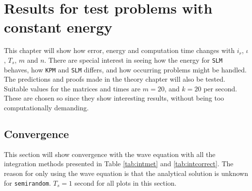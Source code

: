 \chapter{Results for test problems with constant energy}%
\label{sec:constres}
This chapter will show how error, energy and computation time changes with $i_r$, $\iota$, $T_s$, $m$ and $n$. There are special interest in seeing how the energy for \texttt{SLM} behaves, how \texttt{KPM} and \texttt{SLM} differs, and how occurring problems might be handled. The predictions and proofs made in the theory chapter will also be tested. \\

\noindent Suitable values for the matrices and times are $m=20$, and $k = 20$ per second. These are chosen so since they show interesting results, without being too computationally demanding. 
\section{Convergence}%
This section will show convergence with the wave equation with all the integration methods presented in Table \ref{tab:intmet} and \ref{tab:intcorrect}. The reason for only using the wave equation is that the analytical solution is unknown for \texttt{semirandom}. $T_s = 1$ second for all plots in this section.

